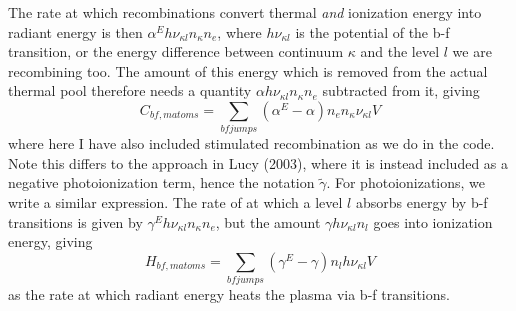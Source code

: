 The rate at which recombinations convert
thermal {\em and} ionization energy into radiant energy is then
$\alpha^E h\nu_{\kappa l} n_\kappa n_e$, where $h \nu_{\kappa l}$ is the potential of the 
b-f transition, or the energy difference between continuum $\kappa$ and 
the level $l$ we are recombining too. 
The amount of this energy which is removed from the actual thermal pool
therefore needs a quantity $\alpha h\nu_{\kappa l} n_\kappa n_e$ subtracted from it,
giving
\begin{equation}
C_{bf,matoms} = \sum_{bf jumps} (\alpha^E - \alpha) n_e n_{\kappa}\nu_{\kappa l} V 
\end{equation}
where here I have also included stimulated recombination as we do in the code. Note
this differs to the approach in Lucy (2003), where it is instead included as a 
negative photoionization term, hence the notation $\widetilde{\gamma}$.
For photoionizations, we write a similar expression. The rate of at which
a level $l$ absorbs energy by b-f transitions is given by $\gamma^E h\nu_{\kappa l} n_\kappa n_e$,
but the amount $\gamma h \nu_{\kappa l} n_l$ goes into ionization energy, giving 
\begin{equation}
H_{bf,matoms} = \sum_{bf jumps} (\gamma^E - \gamma) n_l h \nu_{\kappa l} V
\end{equation}
as the rate at which radiant energy heats the plasma via b-f transitions.




